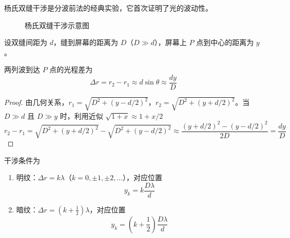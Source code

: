 杨氏双缝干涉是分波前法的经典实验，它首次证明了光的波动性。

\begin{figure}[htbp]
    \centering
    \caption{杨氏双缝干涉示意图}
    \label{fig:杨氏双缝}
\end{figure}

设双缝间距为 $d$，缝到屏幕的距离为 $D$（$D \gg d$），屏幕上 $P$ 点到中心的距离为 $y$。

\begin{theorem}[杨氏双缝干涉的光程差]
    两列波到达 $P$ 点的光程差为
    \begin{equation}
        \Delta r = r_2 - r_1 \approx d\sin\theta \approx \frac{dy}{D}
    \end{equation}
\end{theorem}

\begin{proof}
    由几何关系，$r_1 = \sqrt{D^2 + (y - d/2)^2}$，$r_2 = \sqrt{D^2 + (y + d/2)^2}$。当 $D \gg d$ 且 $D \gg y$ 时，利用近似 $\sqrt{1+x} \approx 1 + x/2$
    \begin{equation}
        r_2 - r_1 = \sqrt{D^2 + (y+d/2)^2} - \sqrt{D^2 + (y-d/2)^2} \approx \frac{(y+d/2)^2 - (y-d/2)^2}{2D} = \frac{dy}{D}
    \end{equation}
\end{proof}

干涉条件为
\begin{enumerate}
    \item 明纹：$\Delta r = k\lambda$（$k = 0, \pm1, \pm2, \ldots$），对应位置
    \begin{equation}
        y_k = k\frac{D\lambda}{d}
    \end{equation}
    \item 暗纹：$\Delta r = (k + \frac{1}{2})\lambda$，对应位置
    \begin{equation}
        y_k = \left(k + \frac{1}{2}\right)\frac{D\lambda}{d}
    \end{equation}
\end{enumerate}

